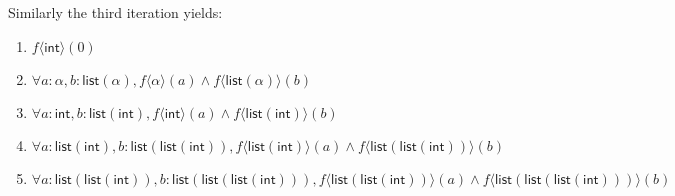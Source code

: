 \documentclass[]{ceurart}
\newcommand\ty[1]{\textsf{#1}}
\begin{document}
Similarly the third iteration yields:

\begin{enumerate}
   \item \(f\langle \ty{int}\rangle(0)\)
   \item \(\forall a: \alpha, b:\ty{list}(\alpha), f\langle\alpha\rangle(a) \land f\langle \ty{list}(\alpha)\rangle(b)\)
   \item \(\forall a: \ty{int}, b:\ty{list}(\ty{int}), f\langle\ty{int}\rangle(a) \land f\langle \ty{list}(\ty{int})\rangle(b)\)
   \item \(\forall a: \ty{list}(\ty{int}), b:\ty{list}(\ty{list}(\ty{int})), f\langle\ty{list}(\ty{int})\rangle(a) \land f\langle \ty{list}(\ty{list}(\ty{int}))\rangle(b)\)
   \item \(\forall a: \ty{list}(\ty{list}(\ty{int})), b:\ty{list}(\ty{list}(\ty{list}(\ty{int}))), f\langle\ty{list}(\ty{list}(\ty{int}))\rangle(a) \land f\langle \ty{list}(\ty{list}(\ty{list}(\ty{int})))\rangle(b)\)
\end{enumerate}
\end{document}
